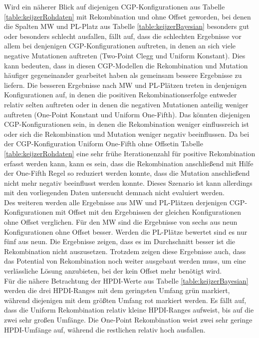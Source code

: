 Wird ein näherer Blick auf diejenigen CGP-Konfigurationen aus Tabelle \ref{table:keijzerRohdaten} mit Rekombination und ohne Offset geworden, bei denen die Spalten MW und PL-Platz aus Tabelle \ref{table:keijzerBayesian} besonders gut oder besonders schlecht ausfallen, fällt auf, dass die schlechten Ergebnisse vor allem bei denjenigen CGP-Konfigurationen auftreten, in denen an sich viele negative Mutationen auftreten (Two-Point Clegg und Uniform Konstant).
Dies kann bedeuten, dass in diesen CGP-Modellen die Rekombination und Mutation häufiger gegeneinander gearbeitet haben als gemeinsam bessere Ergebnisse zu liefern.
Die besseren Ergebnisse nach MW und PL-Plätzen treten in denjenigen Konfigurationen auf, in denen die positiven Rekombinationserfolge entweder relativ selten auftreten oder in denen die negativen Mutationen anteilig weniger auftreten (One-Point Konstant und Uniform One-Fifth).
Das könnten diejenigen CGP-Konfigurationen sein, in denen die Rekombination weniger einflussreich ist oder sich die Rekombination und Mutation weniger negativ beeinflussen.
Da bei der CGP-Konfiguration \glqq Uniform One-Fifth ohne Offset\grqq\space in Tabelle \ref{table:keijzerRohdaten} eine sehr frühe Iterationenzahl für positive Rekombination erfasst werden kann, kann es sein, dass die Rekombination anschließend mit Hilfe der One-Fifth Regel so reduziert werden konnte, dass die Mutation anschließend nicht mehr negativ beeinflusst werden konnte.
Dieses Szenario ist kann allerdings mit den vorliegenden Daten untersucht demnach nicht evaluiert werden.\\
Des weiteren werden alle Ergebnisse aus MW und PL-Plätzen derjenigen CGP-Kon\-fi\-gu\-ra\-tionen mit Offset mit den Ergebnissen der gleichen Konfigurationen ohne Offset verglichen.
Für den MW sind die Ergebnisse von sechs aus neun Konfigurationen ohne Offset besser.
Werden die PL-Plätze bewertet sind es nur fünf aus neun.
Die Ergebnisse zeigen, dass es im Durchschnitt besser ist die Rekombination nicht auszusetzen.
Trotzdem zeigen diese Ergebnisse auch, dass das Potential von Rekombination noch weiter ausgebaut werden muss, um eine verlässliche Lösung anzubieten, bei der kein Offset mehr benötigt wird.\\
Für die nähere Betrachtung der HPDI-Werte aus Tabelle \ref{table:keijzerBayesian} werden die drei HPDI-Ranges mit dem geringsten Umfang grün markiert, während diejenigen mit dem größten Umfang rot markiert werden.
Es fällt auf, dass die Uniform Rekombination relativ kleine HPDI-Ranges aufweist, bis auf die zwei sehr großen Umfänge.
Die One-Point Rekombination weist zwei sehr geringe HPDI-Umfänge auf, während die restlichen relativ hoch ausfallen.

